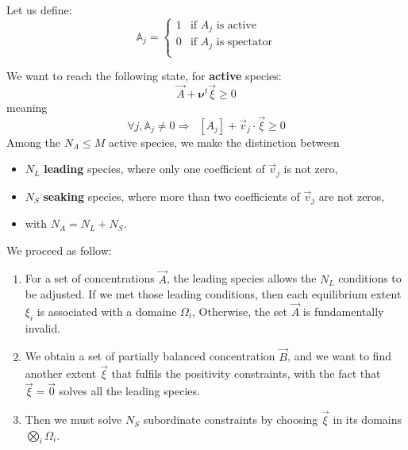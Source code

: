 \documentclass[aps,onecolumn,11pt]{revtex4}
\begin{document}
Let us define:
\begin{equation}
	\mathbb{A}_j = \left\lbrace
	\begin{array}{cl}
	1 & \text{if $A_j$ is active}\\
	0 & \text{if $A_j$ is spectator}\\
	\end{array}
	\right.
\end{equation}

We want to reach the following state, for \textbf{active} species:
\begin{equation}
	\vec{A} + \bm{\nu}^t \vec{\xi} \geq 0
\end{equation}
meaning
\begin{equation}
	\forall j, \mathbb{A}_j\not=0 \Rightarrow \;\; [A_j] + \vec{v}_j \cdot \vec{\xi} \geq 0
\end{equation}
Among the $N_A\leq M$ active species, we make the distinction between 
\begin{itemize}
\item  $N_L$ \textbf{leading} species, where only one coefficient of $\vec{v}_j$ is not zero,
\item  $N_S$ \textbf{seaking} species, where more than two coefficients of $\vec{v}_j$ are not zeros,
\item  with $N_A=N_L+N_S$.
\end{itemize}
We proceed as follow:
\begin{enumerate}
\item For a set of concentrations $\vec{A}$, the leading species allows the $N_L$ conditions to be adjusted.
If we met those leading conditions, then each equilibrium extent $\xi_i$ is associated with a domaine $\Omega_i$,
Otherwise, the set $\vec{A}$ is fundamentally invalid.

\item We obtain a set of partially balanced concentration $\vec{B}$, and we want to find another extent $\vec{\xi}$ that
fulfils the positivity constraints, with the fact that $\vec{\xi}=\vec{0}$ solves all the leading species.

\item Then we must solve $N_S$ subordinate constraints by choosing $\vec{\xi}$ in its domains $\bigotimes_i \Omega_i$.
\end{enumerate}


%
 
\end{document}

